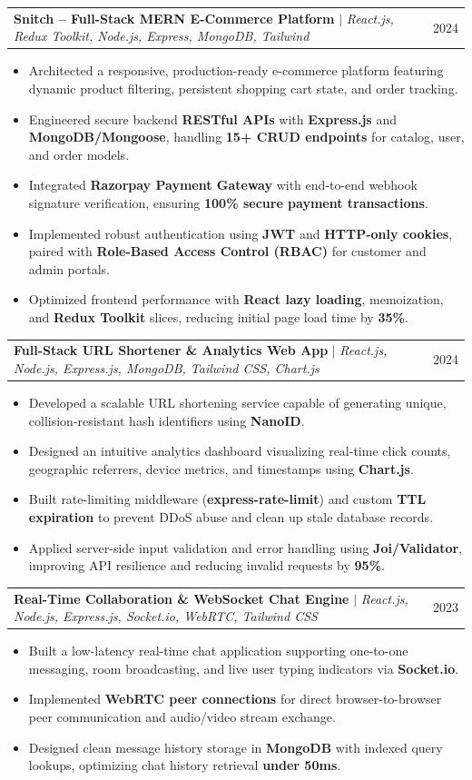 \documentclass[letterpaper,10pt]{article}
\makeatletter
\newcommand{\resumeItem}[1]{
  \item\small{
    {#1 \vspace{-1.5pt}}
  }
}
\newcommand{\resumeProjectHeading}[2]{
    \item
    \begin{tabular*}{0.97\textwidth}{l@{\extracolsep{\fill}}r}
      \small#1 & #2 \\
    \end{tabular*}\vspace{-6pt}
}
\newcommand{\resumeItemListStart}{\begin{itemize}[leftmargin=0.15in]}
\newcommand{\resumeItemListEnd}{\end{itemize}\vspace{-4pt}}
\makeatother
\begin{document}
  \resumeProjectHeading
    {\textbf{Snitch -- Full-Stack MERN E-Commerce Platform} $|$ \emph{React.js, Redux Toolkit, Node.js, Express, MongoDB, Tailwind}}{2024}
    \resumeItemListStart
      \resumeItem{Architected a responsive, production-ready e-commerce platform featuring dynamic product filtering, persistent shopping cart state, and order tracking.}
      \resumeItem{Engineered secure backend \textbf{RESTful APIs} with \textbf{Express.js} and \textbf{MongoDB/Mongoose}, handling \textbf{15+ CRUD endpoints} for catalog, user, and order models.}
      \resumeItem{Integrated \textbf{Razorpay Payment Gateway} with end-to-end webhook signature verification, ensuring \textbf{100\% secure payment transactions}.}
      \resumeItem{Implemented robust authentication using \textbf{JWT} and \textbf{HTTP-only cookies}, paired with \textbf{Role-Based Access Control (RBAC)} for customer and admin portals.}
      \resumeItem{Optimized frontend performance with \textbf{React lazy loading}, memoization, and \textbf{Redux Toolkit} slices, reducing initial page load time by \textbf{35\%}.}
    \resumeItemListEnd

  \resumeProjectHeading
    {\textbf{Full-Stack URL Shortener \& Analytics Web App} $|$ \emph{React.js, Node.js, Express.js, MongoDB, Tailwind CSS, Chart.js}}{2024}
    \resumeItemListStart
      \resumeItem{Developed a scalable URL shortening service capable of generating unique, collision-resistant hash identifiers using \textbf{NanoID}.}
      \resumeItem{Designed an intuitive analytics dashboard visualizing real-time click counts, geographic referrers, device metrics, and timestamps using \textbf{Chart.js}.}
      \resumeItem{Built rate-limiting middleware (\textbf{express-rate-limit}) and custom \textbf{TTL expiration} to prevent DDoS abuse and clean up stale database records.}
      \resumeItem{Applied server-side input validation and error handling using \textbf{Joi/Validator}, improving API resilience and reducing invalid requests by \textbf{95\%}.}
    \resumeItemListEnd

  \resumeProjectHeading
    {\textbf{Real-Time Collaboration \& WebSocket Chat Engine} $|$ \emph{React.js, Node.js, Express.js, Socket.io, WebRTC, Tailwind CSS}}{2023}
    \resumeItemListStart
      \resumeItem{Built a low-latency real-time chat application supporting one-to-one messaging, room broadcasting, and live user typing indicators via \textbf{Socket.io}.}
      \resumeItem{Implemented \textbf{WebRTC peer connections} for direct browser-to-browser peer communication and audio/video stream exchange.}
      \resumeItem{Designed clean message history storage in \textbf{MongoDB} with indexed query lookups, optimizing chat history retrieval \textbf{under 50ms}.}
    \resumeItemListEnd
\end{document}
